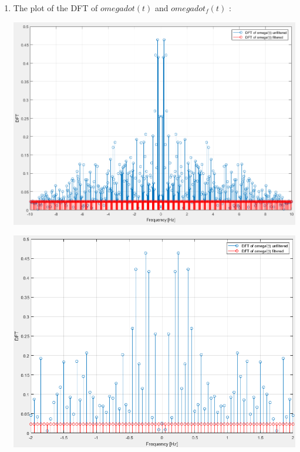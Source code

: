 \documentclass[a4paper,12pt]{article}
\begin{document}
\begin{enumerate}[label={\color{blue}\arabic*)}]
\begin{multicols}{2}
    \end{multicols}

    \item
    The plot of the DFT of \(omega dot(t)\) and \(omega dot_f(t)\) :
    \begin{multicols}{2}
    \begin{flushleft}
            \includegraphics[width=1\linewidth]{Images/DFT_omega_dot_filtered.png}
            \label{Figure11}
        \end{flushleft}
    \columnbreak
    \begin{flushright}
            \includegraphics[width=1\linewidth]{Images/DFT_omega_dot_filtered_zoomed.png}
            \label{Figure12}
        \end{flushright}


\end{multicols}
\end{enumerate}
\end{document}

